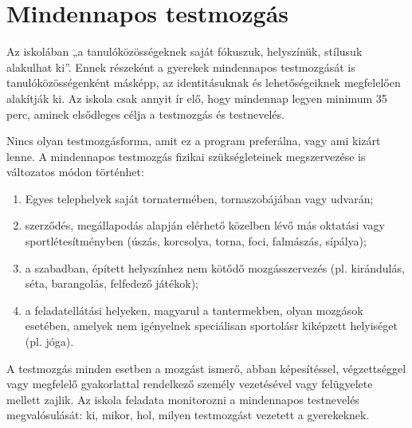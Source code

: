 \hypertarget{mindennapos-testmozgas}{%
\section{Mindennapos testmozgás}\label{mindennapos-testmozgas}}

Az iskolában „a tanulóközösségeknek saját fókuszuk, helyszínük, stílusuk
alakulhat ki''. Ennek részeként a gyerekek mindennapos testmozgását is
tanulóközösségenként másképp, az identitásuknak és lehetőségeiknek megfelelően
alakítják ki. Az iskola csak annyit ír elő, hogy mindennap legyen
minimum 35 perc, aminek elsődleges célja a testmozgás és testnevelés.

Nincs olyan testmozgásforma, amit ez a program preferálna, vagy ami
kizárt lenne. A mindennapos testmozgás fizikai szükségleteinek
megszervezése is változatos módon történhet:

\begin{enumerate}
\tightlist
\def\labelenumi{\arabic{enumi}.}
\item
  Egyes telephelyek saját tornatermében, tornaszobájában vagy udvarán;
\item
  szerződés, megállapodás alapján elérhető közelben lévő más oktatási
  vagy sportlétesítményben (úszás, korcsolya, torna, foci, falmászás,
  sípálya);
\item
  a szabadban, épített helyszínhez nem kötődő mozgásszervezés (pl.
  kirándulás, séta, barangolás, felfedező játékok);
\item
  a feladatellátási helyeken, magyarul a tantermekben,
  olyan mozgások esetében, amelyek nem igényelnek speciálisan
  sportolásr kiképzett helyiséget (pl. jóga).
\end{enumerate}

A testmozgás minden esetben a mozgást ismerő, abban képesítéssel,
végzettséggel vagy megfelelő gyakorlattal rendelkező személy vezetésével
vagy felügyelete mellett zajlik. Az iskola feladata monitorozni a
mindennapos testnevelés megvalósulását: ki, mikor, hol, milyen
testmozgást vezetett a gyerekeknek.
